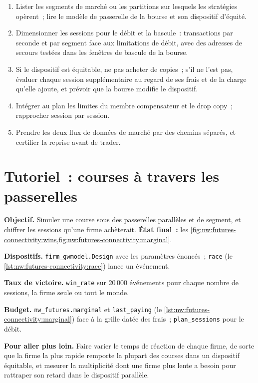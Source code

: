 \begin{method}\label{met:nw:futures-connectivity:plan}
\begin{enumerate}
\item Lister les segments de marché ou les partitions sur lesquels les stratégies opèrent~; lire le modèle de passerelle de la bourse et son dispositif d'équité.
\item Dimensionner les sessions pour le débit et la bascule~: transactions par seconde et par segment face aux limitations de débit, avec des adresses de secours
  testées dans les fenêtres de bascule de la bourse.
\item Si le dispositif est équitable, ne pas acheter de copies~; s'il ne l'est pas, évaluer chaque session supplémentaire au regard de ses frais et de la charge
  qu'elle ajoute, et prévoir que la bourse modifie le dispositif.
\item Intégrer au plan les limites du membre compensateur et le drop copy~; rapprocher session par session.
\item Prendre les deux flux de données de marché par des chemins séparés, et certifier la reprise avant de trader.
\end{enumerate}
\end{method}

\section{Tutoriel~: courses à travers les passerelles}\label{tut:nw:futures-connectivity:tut}

\begin{tutorial}
\textbf{Objectif.} Simuler une course sous des passerelles parallèles et de segment, et chiffrer les sessions qu'une firme achèterait.
\textbf{État final~:} les \cref{fig:nw:futures-connectivity:wins,fig:nw:futures-connectivity:marginal}.
\begin{tutsteps}
\item \textbf{Dispositifs.} \texttt{firm\_gwmodel.Design} avec les paramètres énoncés~; \texttt{race}
  (le \cref{lst:nw:futures-connectivity:race}) lance un événement.
\item \textbf{Taux de victoire.} \texttt{win\_rate} sur 20\,000 événements pour chaque nombre de sessions, la firme seule ou tout le monde.
\item \textbf{Budget.} \texttt{nw\_futures.marginal} et \texttt{last\_paying} (le \cref{lst:nw:futures-connectivity:marginal})
  face à la grille datée des frais~; \texttt{plan\_sessions} pour le débit.
\end{tutsteps}
\textbf{Pour aller plus loin.} Faire varier le temps de réaction de chaque firme, de sorte que la firme la plus rapide remporte la plupart des courses dans un dispositif équitable, et
mesurer la multiplicité dont une firme plus lente a besoin pour rattraper son retard dans le dispositif parallèle.
\end{tutorial}

